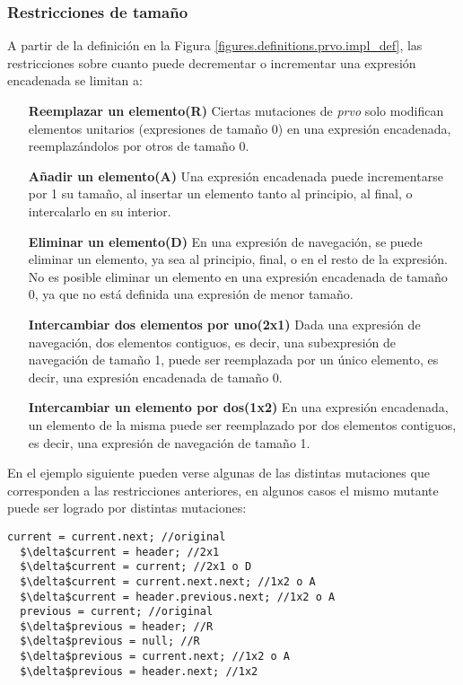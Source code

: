 \subsubsection{Restricciones de tama\~no}
\label{sec:implementation.prvo.restrictions.size}

A partir de la definici\'on en la Figura \ref{figures.definitions.prvo.impl_def}, las restricciones sobre cuanto puede decrementar o incrementar una expresi\'on encadenada se limitan a:

\begin{enumerate}[leftmargin=.75cm,align=left]
	\item[\textbf{Reemplazar un elemento(R)}] Ciertas mutaciones de \emph{prvo} solo modifican elementos unitarios (expresiones de tama\~no 0) en una expresi\'on encadenada, reemplaz\'andolos por otros de tama\~no 0.
	
	\item[\textbf{A\~nadir un elemento(A)}] Una expresi\'on encadenada puede incrementarse por 1 su tama\~no, al insertar un elemento tanto al principio, al final, o intercalarlo en su interior.
	
	\item[\textbf{Eliminar un elemento(D)}] En una expresi\'on de navegaci\'on, se puede eliminar un elemento, ya sea al principio, final, o en el resto de la expresi\'on. No es posible eliminar un elemento en una expresi\'on encadenada de tama\~no 0, ya que no est\'a definida una expresi\'on de menor tama\~no.
	
	\item[\textbf{Intercambiar dos elementos por uno(2x1)}] Dada una expresi\'on de navegaci\'on, dos elementos contiguos, es decir, una subexpresi\'on de navegaci\'on de tama\~no 1, puede ser reemplazada por un \'unico elemento, es decir, una expresi\'on encadenada de tama\~no 0.
	
	\item[\textbf{Intercambiar un elemento por dos(1x2)}] En una expresi\'on encadenada, un elemento de la misma puede ser reemplazado por dos elementos contiguos, es decir, una expresi\'on de navegaci\'on de tama\~no 1.
\end{enumerate}

En el ejemplo siguiente pueden verse algunas de las distintas mutaciones que corresponden a las restricciones anteriores, en algunos casos el mismo mutante puede ser logrado por distintas mutaciones:
\begin{lstlisting}[mathescape=true]
  current = current.next; //original
  $\delta$current = header; //2x1
  $\delta$current = current; //2x1 o D 
  $\delta$current = current.next.next; //1x2 o A
  $\delta$current = header.previous.next; //1x2 o A
  previous = current; //original
  $\delta$previous = header; //R
  $\delta$previous = null; //R
  $\delta$previous = current.next; //1x2 o A
  $\delta$previous = header.next; //1x2
\end{lstlisting}

